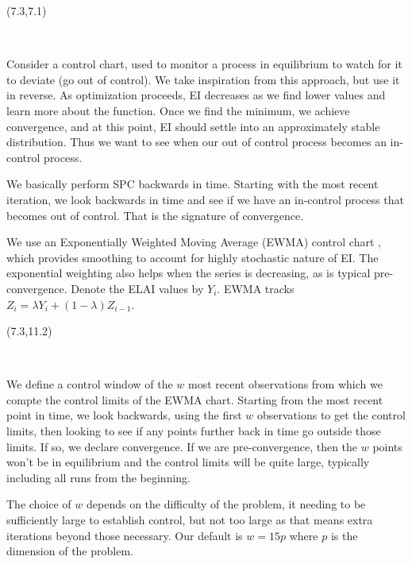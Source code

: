 \documentclass[a0,landscape]{a0poster}
\newcommand{\co}[2]{{{\bf \color{#1}{#2}}}}
\begin{document}
\begin{textblock}{7.8}(7.3,7.1)
\begin{center}
\LARGE \textsc{\co{brown}{Statistical Process Control}}\\
\end{center}
\large

\noindent
Consider a control chart, used to monitor a process in equilibrium to watch
for it to deviate (go out of control). We take inspiration from this approach,
but use it in reverse. As optimization proceeds, EI decreases as
we find lower values and learn more about the function. Once we find the
minimum, we achieve convergence, and at this point, EI should
settle into an approximately stable distribution. Thus we want to see when our
out of control process becomes an in-control process.

\vspace{0.3in}
\noindent
We basically perform SPC backwards in time. Starting with the most recent
iteration, we look backwards in time and see if we have an in-control process that
becomes out of control. That is the signature of convergence. 

\vspace{0.3in}
\noindent
We use an Exponentially Weighted Moving Average (EWMA) control chart
\citep{ewmaPaper}, which provides smoothing to account for highly
stochastic nature of EI. The exponential weighting also helps when the 
series is decreasing, as is typical pre-convergence. Denote the ELAI
values by $Y_i$. EWMA tracks $Z_i = \lambda Y_i + (1-\lambda)Z_{i-1}$. 
\end{textblock}

\begin{textblock}{7.8}(7.3,11.2)
\begin{center}
\LARGE \textsc{\co{green}{Control Window}}\\
\end{center}
\large

\noindent
We define a control window of the $w$ most recent observations from which we 
compte the control limits of the EWMA chart. Starting from the most recent
point in time, we look backwards, using the first $w$ observations to get
the control limits, then looking to see if any points further back in time
go outside those limits. If so, we declare convergence. If we are 
pre-convergence, then the $w$ points won't be in equilibrium and the
control limits will be quite large, typically including all runs from
the beginning.

\vspace{0.3in}
\noindent
The choice of $w$ depends on the difficulty of the problem, it needing
to be sufficiently large to establish control, but not too large as
that means extra iterations beyond those necessary. 
Our default is $w=15p$ where $p$ is the dimension of the problem.
\end{textblock}
\end{document}
